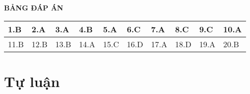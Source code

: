 \hideall
{
	\begin{center}
		\textbf{BẢNG ĐÁP ÁN}
	\end{center}
	\begin{center}
		\begin{tabular}{|m{2.8em}|m{2.8em}|m{2.8em}|m{2.8em}|m{2.8em}|m{2.8em}|m{2.8em}|m{2.8em}|m{2.8em}|m{2.8em}|}
			\hline
			1.B  & 2.A  & 3.A  & 4.B  & 5.A  & 6.C  & 7.A  & 8.C  & 9.C  & 10.A  \\
			\hline
			11.B  & 12.B  & 13.B  & 14.A  & 15.C  & 16.D  & 17.A  & 18.D  & 19.A  & 20.B  \\
			\hline
			
		\end{tabular}
	\end{center}
}
\section{Tự luận}
